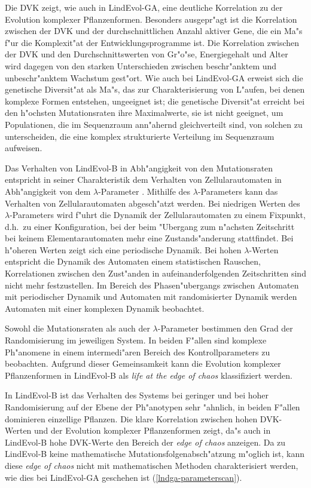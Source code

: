 Die DVK zeigt, wie auch in LindEvol-GA, eine deutliche Korrelation zu der Evolution komplexer Pflanzenformen.
Besonders ausgepr"agt ist die Korrelation zwischen der DVK und der durchschnittlichen Anzahl aktiver Gene,
die ein Ma"s f"ur die Komplexit"at der Entwicklungsprogramme ist. Die Korrelation zwischen der DVK und den
Durchschnittswerten von Gr"o"se, Energiegehalt und Alter wird dagegen von den starken Unterschieden zwischen
beschr"anktem und unbeschr"anktem Wachstum gest"ort. Wie auch bei LindEvol-GA erweist sich die genetische
Diversit"at als Ma"s, das zur Charakterisierung von L"aufen, bei denen komplexe Formen entstehen, ungeeignet ist; die genetische
Diversit"at erreicht bei den h"ochsten Mutationsraten ihre Maximalwerte, sie ist nicht geeignet, um Populationen, die im Sequenzraum
ann"ahernd gleichverteilt sind, von solchen zu unterscheiden, die eine komplex strukturierte Verteilung im Sequenzraum aufweisen.

Das Verhalten von LindEvol-B in Abh"angigkeit von den Mutationsraten entspricht in seiner Charakteristik
dem Verhalten von Zellularautomaten in Abh"angigkeit von dem $\lambda$-Parameter \cite{Langton90,Langton92}.
Mithilfe des $\lambda$-Parameters kann das Verhalten von Zellularautomaten abgesch"atzt werden.
Bei niedrigen Werten des $\lambda$-Parameters wird f"uhrt die Dynamik der Zellularautomaten zu einem Fixpunkt,
d.h.\ zu einer Konfiguration, bei der beim "Ubergang zum n"achsten Zeitschritt bei keinem Elementarautomaten mehr
eine Zustands"anderung stattfindet. Bei h"oheren Werten zeigt sich eine periodische
Dynamik. Bei hohen $\lambda$-Werten entspricht die Dynamik des Automaten einem statistischen Rauschen,
Korrelationen zwischen den Zust"anden in aufeinanderfolgenden Zeitschritten sind nicht mehr festzustellen.
Im Bereich des Phasen"ubergangs zwischen Automaten mit periodischer Dynamik und Automaten mit randomisierter
Dynamik werden Automaten mit einer komplexen Dynamik beobachtet.

Sowohl die Mutationsraten als auch der $\lambda$-Parameter bestimmen den Grad der Randomisierung im jeweiligen
System. In beiden F"allen sind komplexe Ph"anomene in einem intermedi"aren Bereich des Kontrollparameters
zu beobachten. Aufgrund dieser Gemeinsamkeit kann die Evolution komplexer Pflanzenformen in LindEvol-B als
\textsl{life at the edge of chaos} \cite{Langton92} klassifiziert werden.

In LindEvol-B ist das Verhalten des Systems bei geringer und bei hoher Randomisierung auf der
Ebene der Ph"anotypen sehr "ahnlich, in beiden F"allen dominieren einzellige Pflanzen. Die klare Korrelation
zwischen hohen DVK-Werten und der Evolution komplexer Pflanzenformen zeigt, da"s auch in LindEvol-B
hohe DVK-Werte den Bereich der \textsl{edge of chaos} anzeigen. Da zu LindEvol-B keine mathematische
Mutationsfolgenabsch"atzung m"oglich ist, kann diese \textsl{edge of chaos} nicht mit mathematischen
Methoden charakterisiert werden, wie dies bei LindEvol-GA geschehen ist (\ref{lndga-parameterscan}).


